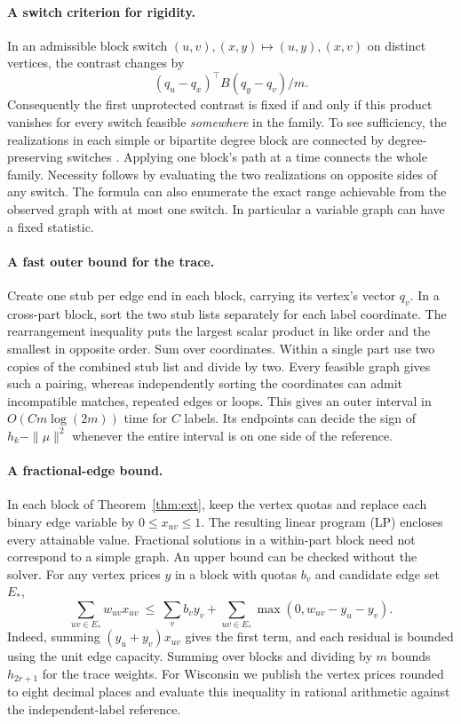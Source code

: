 \documentclass[11pt]{article}
\begin{document}
\paragraph{A switch criterion for rigidity.}
In an admissible block switch $(u,v),(x,y)\mapsto(u,y),(x,v)$ on distinct vertices, the contrast changes by
\[
                 (q_u-q_x)^\top B(q_y-q_v)/m .
\]
Consequently the first unprotected contrast is fixed if and only if this product vanishes for every switch feasible \emph{somewhere} in the family. To see sufficiency, the realizations in each simple or bipartite degree block are connected by degree-preserving switches \cite{switch,nest}. Applying one block's path at a time connects the whole family. Necessity follows by evaluating the two realizations on opposite sides of any switch. The formula can also enumerate the exact range achievable from the observed graph with at most one switch. In particular a variable graph can have a fixed statistic.

\paragraph{A fast outer bound for the trace.}
Create one stub per edge end in each block, carrying its vertex's vector $q_v$. In a cross-part block, sort the two stub lists separately for each label coordinate. The rearrangement inequality puts the largest scalar product in like order and the smallest in opposite order. Sum over coordinates. Within a single part use two copies of the combined stub list and divide by two. Every feasible graph gives such a pairing, whereas independently sorting the coordinates can admit incompatible matches, repeated edges or loops. This gives an outer interval in $O(Cm\log(2m))$ time for $C$ labels. Its endpoints can decide the sign of $h_k-\|\mu\|^2$ whenever the entire interval is on one side of the reference.

\paragraph{A fractional-edge bound.}
In each block of Theorem~\ref{thm:ext}, keep the vertex quotas and replace each binary edge variable by $0\le x_{uv}\le1$. The resulting linear program (LP) encloses every attainable value. Fractional solutions in a within-part block need not correspond to a simple graph. An upper bound can be checked without the solver. For any vertex prices $y$ in a block with quotas $b_v$ and candidate edge set $E_*$,
\[
  \sum_{uv\in E_*} w_{uv}x_{uv}
  \ \le\ \sum_v b_v y_v
       +\sum_{uv\in E_*}\max(0,w_{uv}-y_u-y_v).
\]
Indeed, summing $(y_u+y_v)x_{uv}$ gives the first term, and each residual is bounded using the unit edge capacity. Summing over blocks and dividing by $m$ bounds $h_{2r+1}$ for the trace weights. For Wisconsin we publish the vertex prices rounded to eight decimal places and evaluate this inequality in rational arithmetic against the independent-label reference.
\end{document}
